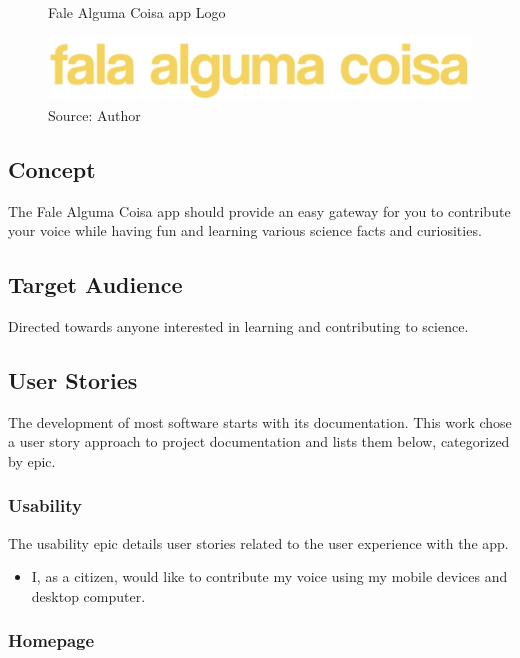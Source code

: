 \begin{figure}[ht]
    \centering
    \caption{Fale Alguma Coisa app Logo}
     \includegraphics[width=\linewidth/2]{images/app/logo.jpg}
    \caption*{Source: Author}
    \label{fig:falealgumacoisa-logo}
\end{figure}

\subsection{Concept}
\label{sec:app-concept}

The Fale Alguma Coisa app should provide an easy gateway for you to contribute your voice while having fun and learning various science facts and curiosities.

\subsection{Target Audience}
\label{sec:app-audience}

Directed towards anyone interested in learning and contributing to science.

\subsection{User Stories}
\label{sec:app-stories}

The development of most software starts with its documentation. This work chose a user story approach to project documentation and lists them below, categorized by epic.

\subsubsection{Usability}

The usability epic details user stories related to the user experience with the app.

\begin{itemize}
    \item I, as a citizen, would like to contribute my voice using my mobile devices and desktop computer.
\end{itemize}

\subsubsection{Homepage}

